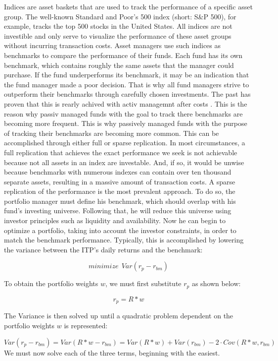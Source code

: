 \documentclass[
  oneside]{book}
\begin{document}
Indices are asset baskets that are used to track the performance of a specific asset group. The well-known Standard and Poor's 500 index (short: S\&P 500), for example, tracks the top 500 stocks in the United States. All indices are not investible and only serve to visualize the performance of these asset groups without incurring transaction costs. Asset managers use such indices as benchmarks to compare the performance of their funds. Each fund has its own benchmark, which contains roughly the same assets that the manager could purchase. If the fund underperforms its benchmark, it may be an indication that the fund manager made a poor decision. That is why all fund managers strive to outperform their benchmarks through carefully chosen investments. The past has proven that this is rearly achived with activ managemnt after costs \citep{Desm2016}. This is the reason why passiv managed funds with the goal to track there benchmarks are becoming more frequent. This is why passively managed funds with the purpose of tracking their benchmarks are becoming more common. This can be accomplished through either full or sparse replication. In most circumstances, a full replication that achieves the exact performance we seek is not achievable because not all assets in an index are investable. And, if so, it would be unwise because benchmarks with numerous indexes can contain over ten thousand separate assets, resulting in a massive amount of transaction costs. A sparse replication of the performance is the most prevalent approach. To do so, the portfolio manager must define his benchmark, which should overlap with his fund's investing universe. Following that, he will reduce this universe using investor principles such as liquidity and availability. Now he can begin to optimize a portfolio, taking into account the investor constraints, in order to match the benchmark performance. Typically, this is accomplished by lowering the variance between the ITP's daily returns and the benchmark:

\[
 minimize \ \ Var(r_{p}-r_{bm})
\]

To obtain the portfolio weights \(w\), we must first substitute \(r_{p}\) as shown below:

\[
  r_{p} = R * w
\]

The Variance is then solved up until a quadratic problem dependent on the portfolio weights \(w\) is represented:

\[
 Var(r_{p}-r_{bm}) = Var(R * w - r_{bm}) = Var(R * w) + Var(r_{bm}) - 2 \cdot Cov(R*w,r_{bm}) 
\]
We must now solve each of the three terms, beginning with the easiest.
\end{document}
